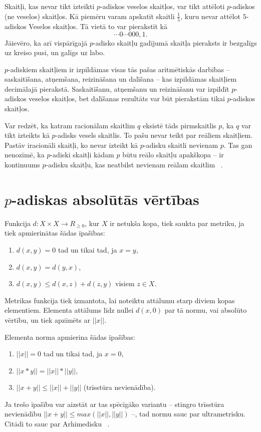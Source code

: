 \documentclass{ludis}
\begin{document}
Skaitļi, kas nevar tikt izteikti $p$-adiskos veselos skaitļos, var tikt attēloti $p$-adiskos (ne veselos) skaitļos. Kā piemēru varam apskatīt skaitli $\frac{1}{5}$, kuru nevar attēlot $5$-adiskos Veselos skaitļos. Tā vietā to var pierakstīt kā
\[
\cdots 0 \cdots 000,1.
\]
Jāievēro, ka arī vispārīgajā $p$-adisko skaitļu gadījumā skaitļa pieraksts ir bezgalīgs uz kreiso pusi, un galīgs uz labo.

$p$-adiskiem skaitļiem ir izpildāmas visas tās pašas aritmētiskās darbības -- saskaitīšana, atņemšana, reizināšana un dalīšana -- kas izpildāmas skaitļiem decimālajā pierakstā. Saskaitīšanu, atņemšanu un reizināšanu var izpildīt $p$-adiskos veselos skaitļos, bet dalīšanas rezultāts var būt pierakstām tikai $p$-adiskos skaitļos.

Var redzēt, ka katram racionālam skaitlim $q$ eksistē tāds pirmskaitlis $p$, ka $q$ var tikt izteikts kā $p$-adisks vesels skaitlis. To pašu nevar teikt par reāliem skaitļiem. Pastāv iracionāli skaitļi, ko nevar izteikt kā $p$-adisku skaitli nevienam $p$. Tas gan nenozīmē, ka $p$-adiski skaitļi kādam $p$ būtu reālo skaitļu apakškopa -- ir kontinuums $p$-adisku skaitļu, kas neatbilst nevienam reālam skaitlim ~\citep{Freivalds2012}.

\section{$p$-adiskas absolūtās vērtības}
Funkcija $d: X \times X \rightarrow R_{\geq 0}$, kur $X$ ir netukša kopa, tiek saukta par metriku, ja tiek apmierinātas šādas īpašības:
\begin{enumerate}
\item $d(x,y) = 0$ tad un tikai tad, ja $x = y$,
\item $d(x,y) = d(y,x)$,
\item $d(x,y) \leq d(x,z) + d(z,y)$ visiem $z \in X$.
\end{enumerate}
Metrikas funkcija tiek izmantota, lai noteiktu attālumu starp diviem kopas elementiem. Elementa attālums līdz nullei $d(x,0)$ par tā normu, vai absolūto vērtību, un tiek apzīmēts ar $||x||$.

Elementa norma apmierina šādas īpašības:
\begin{enumerate}
\item $||x||=0$ tad un tikai tad, ja $x=0$,
\item $||x*y|| = ||x||*||y||$,
\item $||x+y|| \leq ||x||+||y||$ (trīsstūra nevienādība).
\end{enumerate}
Ja trešo īpašību var aizstāt ar tas spēcīgāko variantu -- stingro trīsstūra nevienādību $||x+y|| \leq max(||x||,||y||)$ --, tad normu sauc par ultrametrisku. Citādi to sauc par Arhimedisku ~\citep{Freivalds2012}.
\end{document}
